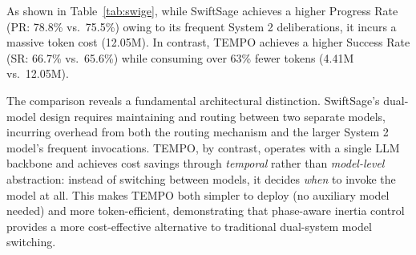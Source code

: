 \documentclass[runningheads]{llncs}
\begin{document}
As shown in Table~\ref{tab:swige}, while SwiftSage achieves a higher Progress Rate (PR: 78.8\% vs.\ 75.5\%) owing to its frequent System 2 deliberations, it incurs a massive token cost (12.05M). In contrast, TEMPO achieves a higher Success Rate (SR: 66.7\% vs.\ 65.6\%) while consuming over 63\% fewer tokens (4.41M vs.\ 12.05M).

The comparison reveals a fundamental architectural distinction. SwiftSage's dual-model design requires maintaining and routing between two separate models, incurring overhead from both the routing mechanism and the larger System 2 model's frequent invocations. TEMPO, by contrast, operates with a single LLM backbone and achieves cost savings through \emph{temporal} rather than \emph{model-level} abstraction: instead of switching between models, it decides \emph{when} to invoke the model at all. This makes TEMPO both simpler to deploy (no auxiliary model needed) and more token-efficient, demonstrating that phase-aware inertia control provides a more cost-effective alternative to traditional dual-system model switching.
\end{document}
